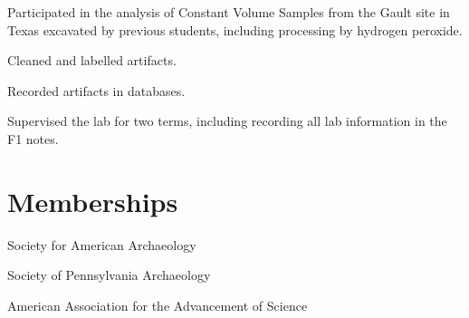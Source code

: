\documentclass[letterpaper]{resume}
\begin{document}
\begin{compactitem}
\item Participated in the analysis of Constant Volume Samples from the Gault site in Texas excavated by previous students, including processing by hydrogen peroxide.
\item Cleaned and labelled artifacts.
\item Recorded artifacts in databases.
\item Supervised the lab for two terms, including recording all lab information in the F1 notes.
\end{compactitem}
\section{Memberships}

\begin{compactitem}
\item Society for American Archaeology
\item Society of Pennsylvania Archaeology 
\item American Association for the Advancement of Science 
\end{compactitem}

\end{document}
